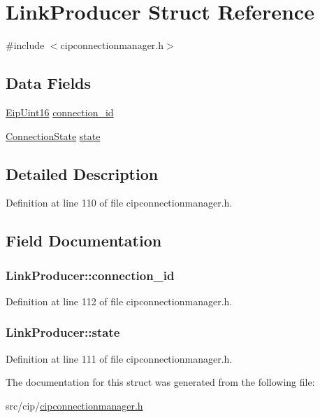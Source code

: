 \hypertarget{structLinkProducer}{\section{\-Link\-Producer \-Struct \-Reference}
\label{de/deb/structLinkProducer}
}


{\ttfamily \#include $<$cipconnectionmanager.\-h$>$}

\subsection*{\-Data \-Fields}
\begin{DoxyCompactItemize}
\item 
\hyperlink{typedefs_8h_ac1b4cfa25b4f5def62f23b455dd395d8}{\-Eip\-Uint16} \hyperlink{structLinkProducer_abd05d51cc6abf27d62874694fd6038aa}{connection\-\_\-id}
\item 
\hyperlink{cipconnectionmanager_8h_acdd867d72142510ce53521a63a062f9b}{\-Connection\-State} \hyperlink{structLinkProducer_a9d403e823d0d94b5134f65e114df5412}{state}
\end{DoxyCompactItemize}


\subsection{\-Detailed \-Description}


\-Definition at line 110 of file cipconnectionmanager.\-h.



\subsection{\-Field \-Documentation}
\hypertarget{structLinkProducer_abd05d51cc6abf27d62874694fd6038aa}{
\subsubsection[{connection\-\_\-id}]{ {\bf \-Link\-Producer\-::connection\-\_\-id}}}\label{de/deb/structLinkProducer_abd05d51cc6abf27d62874694fd6038aa}


\-Definition at line 112 of file cipconnectionmanager.\-h.

\hypertarget{structLinkProducer_a9d403e823d0d94b5134f65e114df5412}{
\subsubsection[{state}]{ {\bf \-Link\-Producer\-::state}}}\label{de/deb/structLinkProducer_a9d403e823d0d94b5134f65e114df5412}


\-Definition at line 111 of file cipconnectionmanager.\-h.



\-The documentation for this struct was generated from the following file\-:\begin{DoxyCompactItemize}
\item 
src/cip/\hyperlink{cipconnectionmanager_8h}{cipconnectionmanager.\-h}\end{DoxyCompactItemize}
